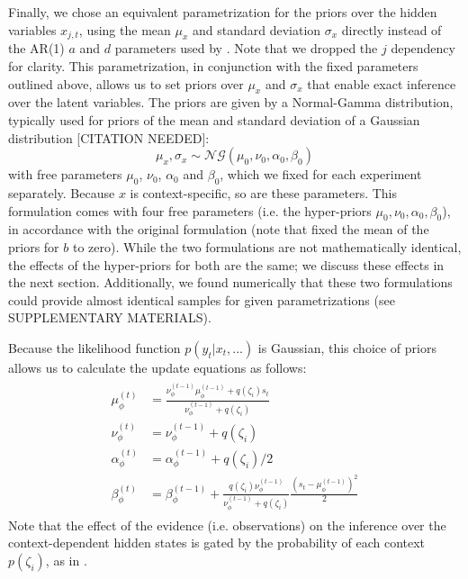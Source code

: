 \documentclass[a4paper,doc,floatsintext,natbib]{apa6}
\begin{document}
Finally, we chose an equivalent parametrization for the priors over the hidden variables $x_{j,t}$, using the mean $\mu_x$ and standard deviation $\sigma_x$ directly instead of the AR(1) $a$ and $d$ parameters used by \cite{Heald_Contextual_2021}. Note that we dropped the $j$ dependency for clarity. This parametrization, in conjunction with the fixed parameters outlined above,  allows us to set priors over $\mu_x$ and $\sigma_x$ that enable exact inference over the latent variables. The priors are given by a Normal-Gamma distribution, typically used for priors of the mean and standard deviation of a Gaussian distribution [CITATION NEEDED]:
\begin{equation}
\mu_x, \sigma_x \sim \mathcal{NG}(\mu_0, \nu_0, \alpha_0, \beta_0)
\end{equation}
with free parameters $\mu_0$, $\nu_0$, $\alpha_0$ and $\beta_0$, which we fixed for each experiment separately. Because $x$ is context-specific, so are these parameters. This formulation comes with four free parameters (i.e. the hyper-priors $\mu_0, \nu_0, \alpha_0, \beta_0$), in accordance with the original formulation (note that \cite{Heald_Contextual_2021} fixed the mean of the priors for $b$ to zero). While the two formulations are not mathematically identical, the effects of the hyper-priors for both are the same; we discuss these effects in the next section. Additionally, we found numerically that these two formulations could provide almost identical samples for given parametrizations (see SUPPLEMENTARY MATERIALS). 

Because the likelihood function $p(y_t | x_t, ...)$ is Gaussian, this choice of priors allows us to calculate the update equations as follows:
\begin{align}
  \begin{split}
  \mu_\phi^{(t)} &= \frac{\nu_\phi^{(t-1)} \mu_\phi^{(t-1)} + q(\zeta_i)s_t}{\nu_\phi^{(t-1)} + q(\zeta_i)} \\
  \nu_\phi^{(t)} &= \nu_\phi^{(t-1)} + q(\zeta_i) \\
  \alpha_\phi^{(t)} &= \alpha_\phi^{(t-1)} + q(\zeta_i) / 2 \\
  \beta_\phi^{(t)} &= \beta_\phi^{(t-1)} + \frac{q(\zeta_i)\nu_\phi^{(t-1)}}{\nu_\phi^{(t-1)} +
    q(\zeta_i)}\frac{\left(s_t - \mu_\phi^{(t-1)}\right)^2}{2}  \label{eqn:update-full}
  \end{split}
\end{align}
Note that the effect of the evidence (i.e. observations) on the inference over the context-dependent hidden states is gated by the probability of each context $p(\zeta_i)$, as in \cite[][supplementary materials]{Heald_Contextual_2021}.
\end{document}
